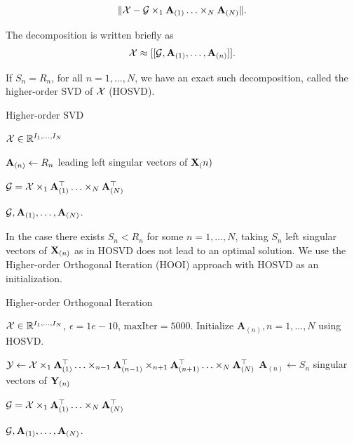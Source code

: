\begin{equation}
    \|\mathcal{X} - \mathcal{G}\times_1\mathbf{A}_{(1)}\ldots \times_N \mathbf{A}_{(N)}\|.
\end{equation}

The decomposition is written briefly as
\begin{equation}
    \mathcal{X} \approx [[\mathcal{G}, \mathbf{A}_{(1)},\ldots, \mathbf{A}_{(n)}]].
\end{equation}

If $S_n = R_n$, for all $n = 1,\ldots,N$, we have an exact such decomposition, called the higher-order SVD of $\mathcal{X}$ (HOSVD).


\begin{algorithm}
    \caption{Higher-order SVD}
    \begin{algorithmic}
        \Require $\mathcal{X}\in{\mathbb{R}}^{I_1,\ldots, I_N}$

        \State $\mathbf{A}_{(n)} \gets R_n$ leading left singular vectors of $\mathbf{X}_({n})$
        \EndFor

        $\mathcal{G} = \mathcal{X}\times_1\mathbf{A}_{(1)}^\top\ldots \times_N \mathbf{A}_{(N)}^\top$

        \Ensure $\mathcal{G}, \mathbf{A}_{(1)},\ldots,\mathbf{A}_{(N)}$.
    \end{algorithmic}
\end{algorithm}

In the case there exists $S_n < R_n$ for some $n = 1,\ldots, N$, taking $S_n$ left singular vectors of $\mathbf{X}_{(n)}$ as in HOSVD does not lead to an optimal solution. We use the Higher-order Orthogonal Iteration (HOOI) approach with HOSVD as an initialization.

\begin{algorithm}
    \caption{Higher-order Orthogonal Iteration}
    \begin{algorithmic}
        \Require $\mathcal{X}\in{\mathbb{R}}^{I_1,\ldots, I_N}$, $\epsilon = 1e-10$, $\text{maxIter} = 5000$.
        \State Initialize $\mathbf{A}_{(n)}, n=1,\ldots, N$ using HOSVD.

        \State $\mathcal{Y} \gets \mathcal{X} \times_1 \mathbf{A}_{(1)}^\top \ldots \times_{n-1} \mathbf{A}_{(n-1)}^\top  \times_{n+1} \mathbf{A}_{(n+1)}^\top \ldots \times_N \mathbf{A}_{(N)}^\top$
        \State $\mathbf{A}_{(n)} \gets S_n$ singular vectors of $\mathbf{Y}_{(n)}$
        \EndFor
        \EndWhile

        $\mathcal{G} = \mathcal{X}\times_1\mathbf{A}_{(1)}^\top\ldots \times_N \mathbf{A}_{(N)}^\top$

        \Ensure $\mathcal{G}, \mathbf{A}_{(1)},\ldots,\mathbf{A}_{(N)}$.
    \end{algorithmic}
\end{algorithm}


